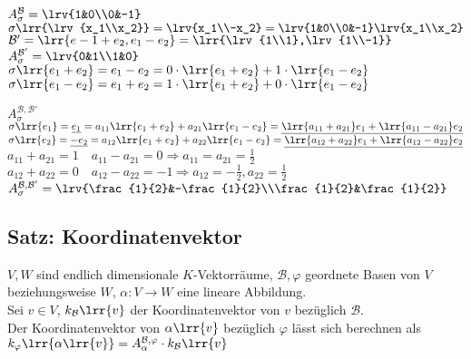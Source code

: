 			$A_{\sigma}^{\mathcal{B}}=\lrv{1&0\\0&-1}$\\
			$\sigma\lrr{\lrv{x_1\\x_2}}=\lrv{x_1\\-x_2}=\lrv{1&0\\0&-1}\lrv{x_1\\x_2}$\\
			$\mathcal{B}'=\lrr{e-1+e_2, e_1-e_2}=\lrr{\lrv{1\\1},\lrv{1\\-1}}$\\
			$A_\sigma^{\mathcal{B}'}=\lrv{0&1\\1&0}$\\
			$\sigma\lrr{e_1+e_2}=e_1-e_2=0\cdot\lrr{e_1+e_2}+1\cdot\lrr{e_1-e_2}$\\
			$\sigma\lrr{e_1-e_2}=e_1+e_2=1\cdot\lrr{e_1+e_2}+0\cdot\lrr{e_1-e_2}$

			$A_\sigma^{\mathcal{B},\mathcal{B}'}$\\
			$\sigma\lrr{e_1}=\underline{e_1}=a_{11}\lrr{e_1+e_2}+a_{21}\lrr{e_1-e_2}=\underline{\lrr{a_{11}+a_{21}}e_1+\lrr{a_{11}-a_{21}}e_2}$\\
			$\sigma\lrr{e_2}=\underline{-e_2}=a_{12}\lrr{e_1+e_2}+a_{22}\lrr{e_1-e_2}=\underline{\lrr{a_{12}+a_{22}}e_1+\lrr{a_{12}-a_{22}}e_2}$\\
			$a_{11}+a_{21}=1\quad a_{11}-a_{21}=0\Rightarrow a_{11}=a_{21}=\frac{1}{2}$\\
			$a_{12}+a_{22}=0\quad a_{12}-a_{22}=-1\Rightarrow a_{12}=-\frac{1}{2},a_{22}=\frac{1}{2}$\\
			$A_\sigma^{\mathcal{B},\mathcal{B}'}=\lrv{\frac{1}{2}&-\frac{1}{2}\\\frac{1}{2}&\frac{1}{2}}$
	\subExEnd

\subsection{Satz: Koordinatenvektor}
	$V,W$ sind endlich dimensionale $K$-Vektorräume, $\mathcal{B},\varphi$ geordnete Basen von $V$\\
	beziehungsweise $W$, $\alpha:V\rightarrow W$ eine lineare Abbildung.\\
	Sei $v\in V$, $k_{\mathcal{B}}\lrr{v}$ der Koordinatenvektor von $v$ bezüglich $\mathcal{B}$.\\
	Der Koordinatenvektor von $\alpha\lrr{v}$ bezüglich $\varphi$ lässt sich berechnen als\\
	$k_\varphi\lrr{\alpha\lrr{v}}=A_{\alpha}^{\mathcal{B},\varphi}\cdot k_\mathcal{B}\lrr{v}$

